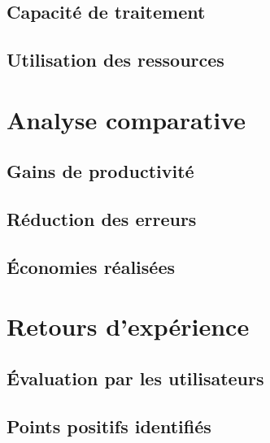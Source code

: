 
\subsection{Capacité de traitement}


\subsection{Utilisation des ressources}


\section{Analyse comparative}


\subsection{Gains de productivité}


\subsection{Réduction des erreurs}


\subsection{Économies réalisées}


\section{Retours d'expérience}


\subsection{Évaluation par les utilisateurs}


\subsection{Points positifs identifiés}

